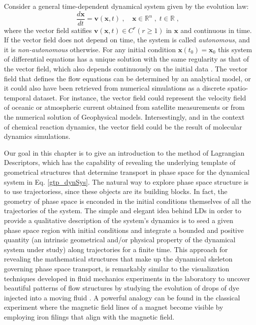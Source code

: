 \documentclass[8pt]{article}
\begin{document}
Consider a general time-dependent dynamical system given by the evolution law:
\begin{equation}
\dfrac{d\mathbf{x}}{dt} = \mathbf{v}(\mathbf{x},t) \;,\quad \mathbf{x} \in \mathbb{R}^{n} \;,\; t \in \mathbb{R} \;,
\label{gtp_dynSys}
\end{equation}
where the vector field satifies $\mathbf{v}(\mathbf{x},t) \in C^{r} (r \geq 1)$ in $\mathbf{x}$ and continuous in time. If the vector field does not depend on time, the system is called \textit{autonomous}, and it is \textit{non-autonomous} otherwise. For any initial condition $\mathbf{x}(t_0) = \mathbf{x}_0$ this system of differential equations has a unique solution with the same regularity as that of the vector field, which also depends continuously on the initial data \cite{coddington1984}. The vector field that defines the flow equations can be determined by an analytical model, or it could also have been retrieved from numerical simulations as a discrete spatio-temporal dataset. For instance, the vector field could represent the velocity field of oceanic or atmospheric current obtained from satellite measurements or from the numerical solution of Geophysical models. Intersestingly, and in the context of chemical reaction dynamics, the vector field could be the result of molecular dynamics simulations.

Our goal in this chapter is to give an introduction to the method of Lagrangian Descriptors, which has the capability of revealing the underlying template of geometrical structures that determine transport in phase space for the dynamical system in Eq. \eqref{gtp_dynSys}. The natural way to explore phase space structure is to use trajectoriess, since these objects are its building blocks. In fact, the geometry of phase space is enconded in the initial conditions themselves of all the trajectories of the system. The simple and elegant idea behind LDs in order to provide a qualitative description of the system's dynamics is to seed a given phase space region with initial conditions and integrate a bounded and positive quantity (an intrinsic geometrical and/or physical property of the dynamical system under study) along trajectories for a finite time. This approach for revealing the mathematical structures that make up the dynamical skeleton governing phase space transport, is remarkably similar to the visualization techniques developed in fluid mechanics experiments in the laboratory to uncover beautiful patterns of flow structures by studying the evolution of drops of dye injected into a moving fluid \cite{chien1986}. A powerful analogy can be found in the classical experiment where the magnetic field lines of a magnet become visible by employing iron filings that align with the magnetic field.
\end{document}
